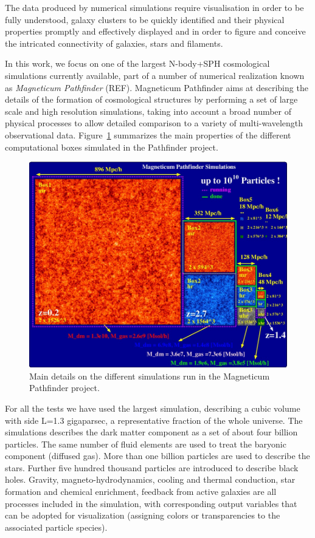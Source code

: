 \documentclass{egpubl}
\begin{document}
The data produced by numerical simulations require visualisation in order to be fully 
understood, galaxy clusters to be quickly identified and 
their physical properties promptly and effectively displayed and in order 
to figure and conceive the intricated  
connectivity of galaxies, stars and filaments.

In this work, we focus on one of the largest N-body+SPH cosmological simulations
currently available, part of a number of numerical realization known as \textit{Magneticum 
Pathfinder} (REF). Magneticum Pathfinder aims at describing the details of the formation 
of cosmological structures by performing a set of large scale and high resolution simulations, 
taking into account a broad number of physical processes to allow detailed comparison 
to a variety of multi-wavelength observational data. Figure~\ref{fig:pathfinder} summarizes 
the main properties of the different computational boxes simulated in the Pathfinder 
project.

\begin{figure}
\centering
\includegraphics[scale=0.33]{pathfinder.jpg}
\caption{Main details on the different simulations run in the Magneticum 
Pathfinder project.}
\label{fig:pathfinder}
\end{figure}

For all the tests we have used the largest simulation, describing a cubic volume
with side L=1.3 gigaparsec, a representative fraction of the whole universe.
The simulations describes the dark matter component as a set of about four billion particles. The 
same number of fluid elements are used to treat the baryonic component (diffused gas).
More than one billion particles are used to describe the stars. Further five hundred
thousand particles are introduced to describe black holes. Gravity, magneto-hydrodynamics,
cooling and thermal conduction, star formation and chemical enrichment, feedback from
active galaxies are all processes included in the simulation, with corresponding
output variables that can be adopted for visualization (assigning colors or transparencies
to the associated particle species).
\end{document}
